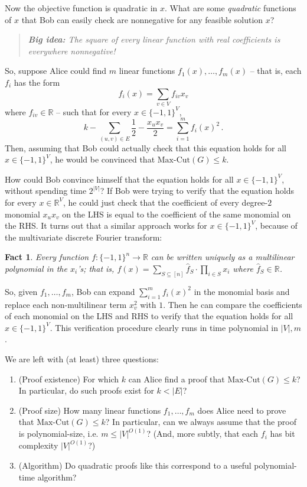 \documentclass[11pt]{article}
\newtheorem{fact}[theorem]{Fact}
\newcommand{\R}{\mathbb{R}} %
\begin{document}
Now the objective function is quadratic in $x$.
What are some \emph{quadratic} functions of $x$ that Bob can easily check are nonnegative for any feasible solution $x$?

\begin{quote}
\begin{center}
\emph{\textbf{Big idea:} The square of every linear function with real coefficients is everywhere nonnegative!}
\end{center}
\end{quote}

So, suppose Alice could find $m$ linear functions $f_1(x),\ldots,f_m(x)$ -- that is, each $f_i$ has the form
\[
f_i(x) = \sum_{v \in V} f_{iv} x_v
\]
where $f_{iv} \in \R$ -- such that for every $x \in \{-1,1\}^V$,
\[
  k - \sum_{(u,v) \in E} \frac 12  - \frac{x_u x_v}{2} = \sum_{i=1}^m f_i(x)^2 \, .
\]
Then, assuming that Bob could actually check that this equation holds for all $x \in \{-1,1\}^V$, he would be convinced that $\text{Max-Cut}(G) \leq k$.

How could Bob convince himself that the equation holds for all $x \in \{-1,1\}^V$, without spending time $2^{|V|}$?
If Bob were trying to verify that the equation holds for every $x \in \R^{V}$, he could just check that the coefficient of every degree-$2$ monomial $x_u x_v$ on the LHS is equal to the coefficient of the same monomial on the RHS.
It turns out that a similar approach works for $x \in \{-1,1\}^V$, because of the multivariate discrete Fourier transform:
\begin{fact}
  Every function $f: \{-1,1\}^n \to \R$ can be written uniquely as a multilinear polynomial in the $x_i$'s; that is, $f(x) = \sum_{S \subseteq [n]} \hat{f}_S \cdot \prod_{i \in S} x_i$ where $\hat{f}_S \in \R$.
\end{fact}
So, given $f_1,\ldots,f_m$, Bob can expand $\sum_{i=1}^m f_i(x)^2$ in the monomial basis and replace each non-multilinear term $x_v^2$ with $1$.
Then he can compare the coefficients of each monomial on the LHS and RHS to verify that the equation holds for all $x \in \{-1,1\}^V$.
This verification procedure clearly runs in time polynomial in $|V|,m$.

We are left with (at least) three questions:

\begin{enumerate}
    \item (Proof existence) For which $k$ can Alice find a proof that $\text{Max-Cut}(G) \leq k$? In particular, do such proofs exist for $k < |E|$?
    \item (Proof size) How many linear functions $f_1,\ldots,f_m$ does Alice need to prove that $\text{Max-Cut}(G) \leq k$?
    In particular, can we always assume that the proof is polynomial-size, i.e. $m \leq |V|^{O(1)}$?
    (And, more subtly, that each $f_i$ has bit complexity $|V|^{O(1)}$?)
    \item (Algorithm) Do quadratic proofs like this correspond to a useful polynomial-time algorithm?
\end{enumerate}
\end{document}

